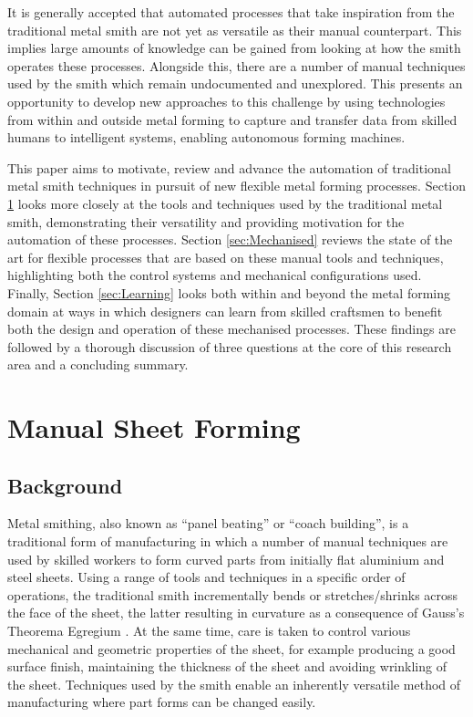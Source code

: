 It is generally accepted that automated processes that take inspiration from the traditional metal smith are not yet as versatile as their manual counterpart.  This implies large amounts of knowledge can be gained from looking at how the smith operates these processes. Alongside this, there are a number of manual techniques used by the smith which remain undocumented and unexplored. This presents an opportunity to develop new approaches to this challenge by using technologies from within and outside metal forming to capture and transfer data from skilled humans to intelligent systems, enabling autonomous forming machines.

This paper aims to motivate, review and advance the automation of traditional metal smith techniques in pursuit of new flexible metal forming processes. Section \ref{sec:Manual} looks more closely at the tools and techniques used by the traditional metal smith, demonstrating their versatility and providing motivation for the automation of these processes. Section \ref{sec:Mechanised} reviews the state of the art for flexible processes that are based on these manual tools and techniques, highlighting both the control systems and mechanical configurations used. Finally, Section \ref{sec:Learning} looks both within and beyond the metal forming domain at ways in which designers can learn from skilled craftsmen to benefit both the design and operation of these mechanised processes. These findings are followed by a thorough discussion of three questions at the core of this research area and a concluding summary. 


\newpage
\section{Manual Sheet Forming}\label{sec:Manual}
\subsection{Background}\label{sec:ManualBackground}
Metal smithing, also known as ``panel beating'' or ``coach building'', is a traditional form of manufacturing in which a number of manual techniques are used by skilled workers to form curved parts from initially flat aluminium and steel sheets. Using a range of tools and techniques in a specific order of operations, the traditional smith incrementally bends or stretches/shrinks across the face of the sheet, the latter resulting in curvature as a consequence of Gauss's Theorema Egregium \citep{Pressley2001ElementaryGeometry}. At the same time, care is taken to control various mechanical and geometric properties of the sheet, for example producing a good surface finish, maintaining the thickness of the sheet and avoiding wrinkling of the sheet. Techniques used by the smith enable an inherently versatile method of manufacturing where part forms can be changed easily.


